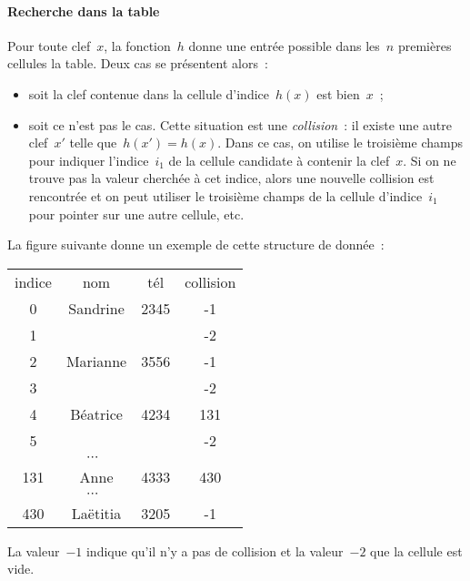 \paragraph{Recherche dans la table}
Pour toute clef~$x$, la  fonction~$h$ donne une entr\'ee possible dans
les~$n$ premi\`eres cellules la table. Deux cas se pr\'esentent alors~:
\begin{itemize}
\item  soit la   clef contenue  dans  la  cellule   d'indice~$h(x)$ est
  bien~$x$~;
\item   soit   ce  n'est   pas le   cas.    Cette  situation  est  une
  \emph{collision}~:    il    existe   une    autre   clef~$x'$  telle
  que~${h(x')=h(x)}$.  Dans ce cas, on  utilise le troisi\`eme  champs
  pour indiquer l'indice~$i_{1}$  de la cellule candidate \`a contenir  la clef~$x$. Si on
  ne trouve pas  la   valeur cherch\'ee  \`a  cet indice,   alors  une
  nouvelle    collision  est  rencontr\'ee   et  on   peut utiliser le
  troisi\`eme champs de la cellule d'indice~$i_{1}$ pour pointer sur une autre cellule,
  etc.
\end{itemize}
La figure suivante donne un exemple de cette structure de donn\'ee~:
\par
\begin{center}
\begin{tabular}{cccc}
indice & nom & t\'el & collision \\
0 & Sandrine & 2345 & -1 \\
1 & & & -2 \\
2 & Marianne & 3556 & -1 \\
3 & & & -2 \\
4 & B\'eatrice & 4234 & 131 \\ 
5 & & & -2\\
\multicolumn{3}{c}{$\cdots$} \\
131 & Anne & 4333 & 430 \\
\multicolumn{3}{c}{$\cdots$} \\
430 & La\"etitia & 3205 & -1 \\
\end{tabular}
\end{center}
La valeur~$-1$ indique qu'il n'y a pas de  collision et la valeur~$-2$
que la cellule est vide. 
